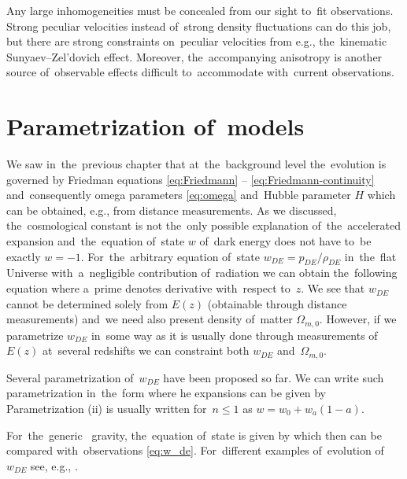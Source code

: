 {Any large inhomogeneities must be concealed from our sight to~fit observations. Strong peculiar velocities instead of~strong density fluctuations can do this job, but there are strong constraints on~peculiar velocities from e.g., the~kinematic Sunyaev--Zel'dovich effect. Moreover, the~accompanying anisotropy is another source of~observable effects difficult to~accommodate with~current observations.
} %
\section{Parametrization of~models}
We saw in~the~previous chapter that at~the~background level the~evolution is governed by Friedman equations \eqref{eq:Friedmann} -- \eqref{eq:Friedmann-continuity} and~consequently omega parameters \eqref{eq:omega} and~Hubble parameter $H$ which can be obtained, e.g., from distance measurements. As we discussed, the~cosmological constant is not the~only possible explanation of~the~accelerated expansion and~the~equation of~state \(w\) of~dark energy does not have to~be exactly \(w=-1\). For~the~arbitrary equation of~state $w_{DE}=p_{DE}/\rho_{DE}$ in~the~flat Universe with~a~negligible contribution of~radiation we can obtain the~following equation
where a~prime denotes derivative with~respect to~\(z\). We see that \(w_{DE}\) cannot be determined solely from \(E(z)\) (obtainable through distance measurements) and~we need also present density of~matter \(\Omega_{m,0}\). However, if we parametrize \(w_{DE}\) in~some way as it is usually done through measurements of~\(E(z)\) at~several redshifts we can constraint both \(w_{DE}\) and~\(\Omega_{m,0}\).

Several parametrization  of~\(w_{DE}\) have been proposed so far. We can write such parametrization  in~the~form
where he expansions can be given by
Parametrization (ii) is usually written for~\(n\leq1\) as \(w=w_0+w_a(1-a)\).

For~the~generic \fR\ gravity, the~equation of~state is given by \parencite{2013qopu.conf...73B}
which then can be compared with~observations \eqref{eq:w_de}. For~different examples of~evolution of~$w_{DE}$ see, e.g., \textcite{2020arXiv200707717A}.